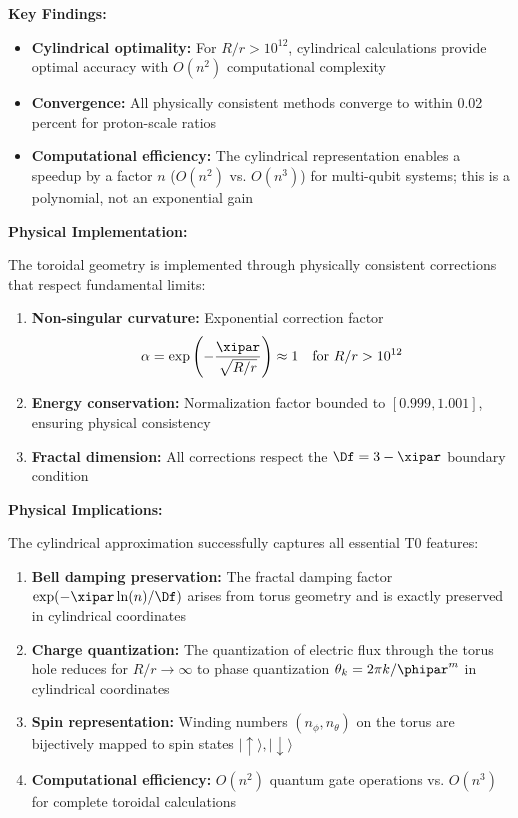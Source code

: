\textbf{Key Findings:}
\begin{itemize}
	\item \textbf{Cylindrical optimality:} For $R/r > 10^{12}$, cylindrical calculations provide 
	optimal accuracy with $O(n^2)$ computational complexity
	\item \textbf{Convergence:} All physically consistent methods converge to within 0.02 percent for proton-scale ratios
	\item \textbf{Computational efficiency:} The cylindrical representation enables a speedup by a factor $n$ ($O(n^2)$ vs. $O(n^3)$) for multi-qubit systems; this is a polynomial, not an exponential gain
\end{itemize}

\textbf{Physical Implementation:}

The toroidal geometry is implemented through physically consistent corrections that respect fundamental limits:

\begin{enumerate}
	\item \textbf{Non-singular curvature:} Exponential correction factor 
	\[
	\alpha = \exp\left(-\frac{\xipar}{\sqrt{R/r}}\right) \approx 1 \quad \text{for } R/r > 10^{12}
	\]
	
	\item \textbf{Energy conservation:} Normalization factor bounded to $[0.999, 1.001]$, 
	ensuring physical consistency
	
	\item \textbf{Fractal dimension:} All corrections respect the $\Df = 3 - \xipar$ boundary condition
\end{enumerate}

\textbf{Physical Implications:}

The cylindrical approximation successfully captures all essential T0 features:

\begin{enumerate}
	\item \textbf{Bell damping preservation:} The fractal damping factor 
	$\exp(-\xipar\ln(n)/\Df)$ arises from torus geometry and is exactly preserved in cylindrical coordinates
	
	\item \textbf{Charge quantization:} The quantization of electric flux through the torus hole reduces for $R/r \to \infty$ to phase quantization 
	$\theta_k = 2\pi k / \phipar^m$ in cylindrical coordinates
	
	\item \textbf{Spin representation:} Winding numbers $(n_\phi, n_\theta)$ on the torus are bijectively mapped to spin states $|\uparrow\rangle, |\downarrow\rangle$
	
	\item \textbf{Computational efficiency:} $O(n^2)$ quantum gate operations vs. $O(n^3)$ for complete toroidal calculations
\end{enumerate}

